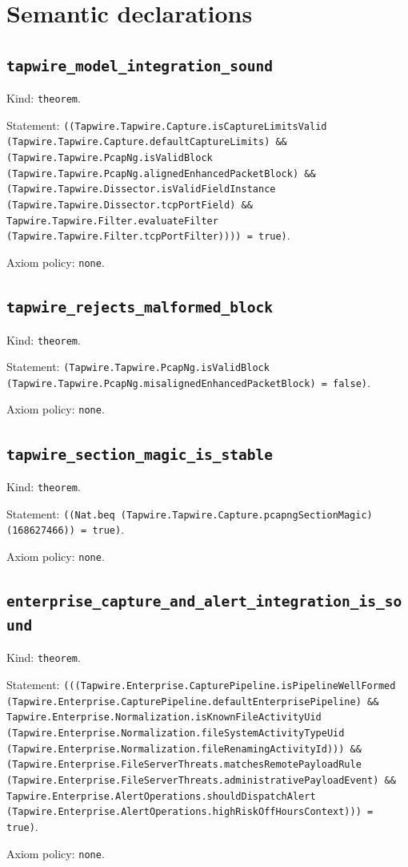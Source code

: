 \documentclass[11pt]{article}
\begin{document}
\section*{Semantic declarations}
\subsection*{\texttt{tapwire\_model\_integration\_sound}}
\noindent Kind: \texttt{theorem}.\par
\noindent Statement: \texttt{((Tapwire.Tapwire.Capture.isCaptureLimitsValid (Tapwire.Tapwire.Capture.defaultCaptureLimits) \&\& (Tapwire.Tapwire.PcapNg.isValidBlock (Tapwire.Tapwire.PcapNg.alignedEnhancedPacketBlock) \&\& (Tapwire.Tapwire.Dissector.isValidFieldInstance (Tapwire.Tapwire.Dissector.tcpPortField) \&\& Tapwire.Tapwire.Filter.evaluateFilter (Tapwire.Tapwire.Filter.tcpPortFilter)))) = true)}.\par
\noindent Axiom policy: \texttt{none}.\par
\subsection*{\texttt{tapwire\_rejects\_malformed\_block}}
\noindent Kind: \texttt{theorem}.\par
\noindent Statement: \texttt{(Tapwire.Tapwire.PcapNg.isValidBlock (Tapwire.Tapwire.PcapNg.misalignedEnhancedPacketBlock) = false)}.\par
\noindent Axiom policy: \texttt{none}.\par
\subsection*{\texttt{tapwire\_section\_magic\_is\_stable}}
\noindent Kind: \texttt{theorem}.\par
\noindent Statement: \texttt{((Nat.beq (Tapwire.Tapwire.Capture.pcapngSectionMagic) (168627466)) = true)}.\par
\noindent Axiom policy: \texttt{none}.\par
\subsection*{\texttt{enterprise\_capture\_and\_alert\_integration\_is\_sound}}
\noindent Kind: \texttt{theorem}.\par
\noindent Statement: \texttt{(((Tapwire.Enterprise.CapturePipeline.isPipelineWellFormed (Tapwire.Enterprise.CapturePipeline.defaultEnterprisePipeline) \&\& Tapwire.Enterprise.Normalization.isKnownFileActivityUid (Tapwire.Enterprise.Normalization.fileSystemActivityTypeUid (Tapwire.Enterprise.Normalization.fileRenamingActivityId))) \&\& (Tapwire.Enterprise.FileServerThreats.matchesRemotePayloadRule (Tapwire.Enterprise.FileServerThreats.administrativePayloadEvent) \&\& Tapwire.Enterprise.AlertOperations.shouldDispatchAlert (Tapwire.Enterprise.AlertOperations.highRiskOffHoursContext))) = true)}.\par
\noindent Axiom policy: \texttt{none}.\par
\end{document}
